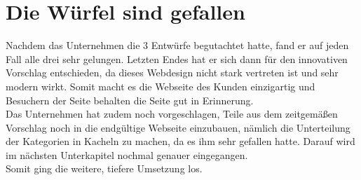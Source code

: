 \section{Die Würfel sind gefallen}
Nachdem das Unternehmen die 3 Entwürfe begutachtet hatte, fand er auf jeden Fall alle drei sehr gelungen. Letzten Endes hat er sich dann für den innovativen Vorschlag entschieden, da dieses Webdesign nicht stark vertreten ist und sehr modern wirkt. Somit macht es die Webseite des Kunden einzigartig und Besuchern der Seite behalten die Seite gut in Erinnerung. 
\\
Das Unternehmen hat zudem noch vorgeschlagen, Teile aus dem zeitgemäßen Vorschlag noch in die endgültige Webseite einzubauen, nämlich die Unterteilung der Kategorien in Kacheln zu machen, da es ihm sehr gefallen hatte. Darauf wird im nächsten Unterkapitel nochmal genauer eingegangen.
\\
Somit ging die weitere, tiefere Umsetzung los.